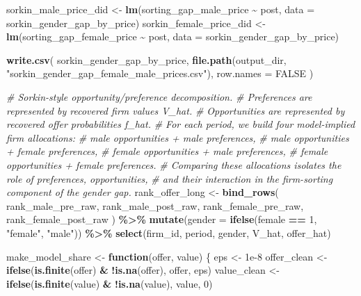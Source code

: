 \documentclass[
]{article}
\newenvironment{Shaded}{\begin{snugshade}}{\end{snugshade}}
\newcommand{\AttributeTok}[1]{\textcolor[rgb]{0.13,0.29,0.53}{#1}}
\newcommand{\CommentTok}[1]{\textcolor[rgb]{0.56,0.35,0.01}{\textit{#1}}}
\newcommand{\ConstantTok}[1]{\textcolor[rgb]{0.56,0.35,0.01}{#1}}
\newcommand{\ControlFlowTok}[1]{\textcolor[rgb]{0.13,0.29,0.53}{\textbf{#1}}}
\newcommand{\DecValTok}[1]{\textcolor[rgb]{0.00,0.00,0.81}{#1}}
\newcommand{\FloatTok}[1]{\textcolor[rgb]{0.00,0.00,0.81}{#1}}
\newcommand{\FunctionTok}[1]{\textcolor[rgb]{0.13,0.29,0.53}{\textbf{#1}}}
\newcommand{\NormalTok}[1]{#1}
\newcommand{\OtherTok}[1]{\textcolor[rgb]{0.56,0.35,0.01}{#1}}
\newcommand{\SpecialCharTok}[1]{\textcolor[rgb]{0.81,0.36,0.00}{\textbf{#1}}}
\newcommand{\StringTok}[1]{\textcolor[rgb]{0.31,0.60,0.02}{#1}}
\begin{document}
\begin{Shaded}
\begin{Highlighting}[]
\NormalTok{sorkin\_male\_price\_did }\OtherTok{\textless{}{-}} \FunctionTok{lm}\NormalTok{(sorting\_gap\_male\_price }\SpecialCharTok{\textasciitilde{}}\NormalTok{ post, }\AttributeTok{data =}\NormalTok{ sorkin\_gender\_gap\_by\_price)}
\NormalTok{sorkin\_female\_price\_did }\OtherTok{\textless{}{-}} \FunctionTok{lm}\NormalTok{(sorting\_gap\_female\_price }\SpecialCharTok{\textasciitilde{}}\NormalTok{ post, }\AttributeTok{data =}\NormalTok{ sorkin\_gender\_gap\_by\_price)}

\FunctionTok{write.csv}\NormalTok{(}
\NormalTok{    sorkin\_gender\_gap\_by\_price,}
    \FunctionTok{file.path}\NormalTok{(output\_dir, }\StringTok{"sorkin\_gender\_gap\_female\_male\_prices.csv"}\NormalTok{),}
    \AttributeTok{row.names =} \ConstantTok{FALSE}
\NormalTok{)}

\CommentTok{\# Sorkin{-}style opportunity/preference decomposition.}
\CommentTok{\# Preferences are represented by recovered firm values V\_hat.}
\CommentTok{\# Opportunities are represented by recovered offer probabilities f\_hat.}
\CommentTok{\# For each period, we build four model{-}implied firm allocations:}
\CommentTok{\#   male opportunities + male preferences,}
\CommentTok{\#   male opportunities + female preferences,}
\CommentTok{\#   female opportunities + male preferences,}
\CommentTok{\#   female opportunities + female preferences.}
\CommentTok{\# Comparing these allocations isolates the role of preferences, opportunities,}
\CommentTok{\# and their interaction in the firm{-}sorting component of the gender gap.}
\NormalTok{rank\_offer\_long }\OtherTok{\textless{}{-}} \FunctionTok{bind\_rows}\NormalTok{(}
\NormalTok{    rank\_male\_pre\_raw,}
\NormalTok{    rank\_male\_post\_raw,}
\NormalTok{    rank\_female\_pre\_raw,}
\NormalTok{    rank\_female\_post\_raw}
\NormalTok{) }\SpecialCharTok{\%\textgreater{}\%}
    \FunctionTok{mutate}\NormalTok{(}\AttributeTok{gender =} \FunctionTok{ifelse}\NormalTok{(female }\SpecialCharTok{==} \DecValTok{1}\NormalTok{, }\StringTok{"female"}\NormalTok{, }\StringTok{"male"}\NormalTok{)) }\SpecialCharTok{\%\textgreater{}\%}
    \FunctionTok{select}\NormalTok{(firm\_id, period, gender, V\_hat, offer\_hat)}

\NormalTok{make\_model\_share }\OtherTok{\textless{}{-}} \ControlFlowTok{function}\NormalTok{(offer, value) \{}
\NormalTok{    eps }\OtherTok{\textless{}{-}} \FloatTok{1e{-}8}
\NormalTok{    offer\_clean }\OtherTok{\textless{}{-}} \FunctionTok{ifelse}\NormalTok{(}\FunctionTok{is.finite}\NormalTok{(offer) }\SpecialCharTok{\&} \SpecialCharTok{!}\FunctionTok{is.na}\NormalTok{(offer), offer, eps)}
\NormalTok{    value\_clean }\OtherTok{\textless{}{-}} \FunctionTok{ifelse}\NormalTok{(}\FunctionTok{is.finite}\NormalTok{(value) }\SpecialCharTok{\&} \SpecialCharTok{!}\FunctionTok{is.na}\NormalTok{(value), value, }\DecValTok{0}\NormalTok{)}


\end{Highlighting}
\end{Shaded}
\end{document}
